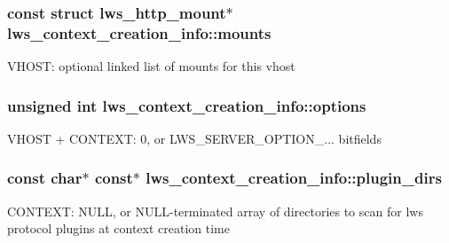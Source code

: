 \subsubsection[{\texorpdfstring{mounts}{mounts}}]{\setlength{\rightskip}{0pt plus 5cm}const struct {\bf lws\+\_\+http\+\_\+mount}$\ast$ lws\+\_\+context\+\_\+creation\+\_\+info\+::mounts}\hypertarget{structlws__context__creation__info_a13ffbb0d010309669611f8c4eda7d7f8}{}\label{structlws__context__creation__info_a13ffbb0d010309669611f8c4eda7d7f8}
V\+H\+O\+ST\+: optional linked list of mounts for this vhost 
\subsubsection[{\texorpdfstring{options}{options}}]{\setlength{\rightskip}{0pt plus 5cm}unsigned int lws\+\_\+context\+\_\+creation\+\_\+info\+::options}\hypertarget{structlws__context__creation__info_a9d3b17a25e1fbc772f21eb4959a82724}{}\label{structlws__context__creation__info_a9d3b17a25e1fbc772f21eb4959a82724}
V\+H\+O\+ST + C\+O\+N\+T\+E\+XT\+: 0, or L\+W\+S\+\_\+\+S\+E\+R\+V\+E\+R\+\_\+\+O\+P\+T\+I\+O\+N\+\_\+... bitfields 
\subsubsection[{\texorpdfstring{plugin\+\_\+dirs}{plugin\_dirs}}]{\setlength{\rightskip}{0pt plus 5cm}const char$\ast$ const$\ast$ lws\+\_\+context\+\_\+creation\+\_\+info\+::plugin\+\_\+dirs}\hypertarget{structlws__context__creation__info_a8122cfc0810bafe51edb3ba6bf9a1251}{}\label{structlws__context__creation__info_a8122cfc0810bafe51edb3ba6bf9a1251}
C\+O\+N\+T\+E\+XT\+: N\+U\+LL, or N\+U\+L\+L-\/terminated array of directories to scan for lws protocol plugins at context creation time 

